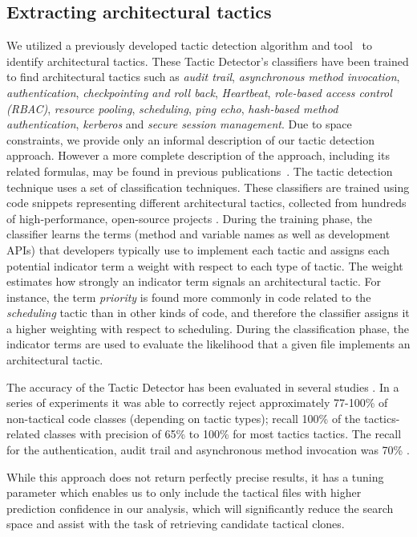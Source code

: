 \subsection{Extracting architectural tactics}
We utilized a previously developed tactic detection algorithm and tool~\cite{ICSE2012, FSE2014} to identify architectural tactics. These Tactic Detector's classifiers have been trained to find architectural tactics such as \textit{audit trail}, \textit{asynchronous method invocation}, \textit{authentication}, \textit{checkpointing and roll back}, \textit{Heartbeat}, \textit{role-based access control (RBAC)}, \textit{resource pooling}, \textit{scheduling}, \textit{ping echo}, \textit{hash-based method authentication}, \textit{kerberos} and \textit{secure session management}. Due to space constraints, we provide only an informal description of our tactic detection approach. However a more complete description of the approach, including its related formulas, may be found in previous publications~\cite{Dissertation, ICSE2012}. The tactic detection technique uses a set of classification techniques. These classifiers are trained using code snippets representing different architectural tactics, collected from hundreds of high-performance, open-source projects \cite{FSE2012,ICSE2012,Dissertation}. During the training phase, the classifier learns the terms (method and variable names as well as development APIs) that developers typically use to implement each tactic and assigns each potential indicator term a weight with respect to each type of tactic. The weight estimates how strongly an indicator term signals an architectural tactic. For instance, the term \emph{priority} is found more commonly in code related to the \emph{scheduling} tactic than in other kinds of code, and therefore the classifier assigns it a higher weighting with respect to scheduling. During the classification phase, the indicator terms are used to evaluate the likelihood that a given file implements an architectural tactic.

The accuracy of the Tactic Detector has been evaluated in several studies \cite{ICSE2012,FSE2014,Dissertation}. In a series of  experiments it was able to correctly reject approximately 77-100\% of non-tactical code classes (depending on tactic types); recall 100\% of the tactics-related classes with precision of 65\% to 100\% for most tactics tactics.  The recall for the authentication, audit trail and asynchronous method invocation was 70\% .

While this approach does not return perfectly precise results, it has a tuning parameter which enables us to only include the tactical files with higher prediction confidence in our analysis, which will significantly reduce the search space and assist with the task of retrieving candidate tactical clones.


